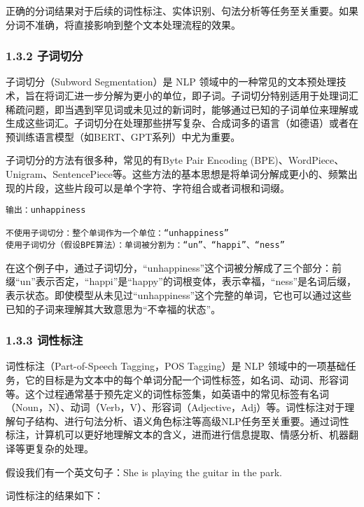 \documentclass[12pt,a4paper]{book}
\begin{document}
正确的分词结果对于后续的词性标注、实体识别、句法分析等任务至关重要。如果分词不准确，将直接影响到整个文本处理流程的效果。

\subsubsection{1.3.2 子词切分}\label{ux5b50ux8bcdux5207ux5206}

子词切分（Subword Segmentation）是 NLP
领域中的一种常见的文本预处理技术，旨在将词汇进一步分解为更小的单位，即子词。子词切分特别适用于处理词汇稀疏问题，即当遇到罕见词或未见过的新词时，能够通过已知的子词单位来理解或生成这些词汇。子词切分在处理那些拼写复杂、合成词多的语言（如德语）或者在预训练语言模型（如BERT、GPT系列）中尤为重要。

子词切分的方法有很多种，常见的有Byte Pair Encoding
(BPE)、WordPiece、Unigram、SentencePiece等。这些方法的基本思想是将单词分解成更小的、频繁出现的片段，这些片段可以是单个字符、字符组合或者词根和词缀。

\begin{verbatim}
输出：unhappiness

不使用子词切分：整个单词作为一个单位：“unhappiness”
使用子词切分（假设BPE算法）：单词被分割为：“un”、“happi”、“ness”
\end{verbatim}

在这个例子中，通过子词切分，``unhappiness''这个词被分解成了三个部分：前缀``un''表示否定，``happi''是``happy''的词根变体，表示幸福，``ness''是名词后缀，表示状态。即使模型从未见过``unhappiness''这个完整的单词，它也可以通过这些已知的子词来理解其大致意思为``不幸福的状态''。

\subsubsection{1.3.3 词性标注}\label{ux8bcdux6027ux6807ux6ce8}

词性标注（Part-of-Speech Tagging，POS Tagging）是 NLP
领域中的一项基础任务，它的目标是为文本中的每个单词分配一个词性标签，如名词、动词、形容词等。这个过程通常基于预先定义的词性标签集，如英语中的常见标签有名词（Noun，N）、动词（Verb，V）、形容词（Adjective，Adj）等。词性标注对于理解句子结构、进行句法分析、语义角色标注等高级NLP任务至关重要。通过词性标注，计算机可以更好地理解文本的含义，进而进行信息提取、情感分析、机器翻译等更复杂的处理。

假设我们有一个英文句子：She is playing the guitar in the park.

词性标注的结果如下：
\end{document}
